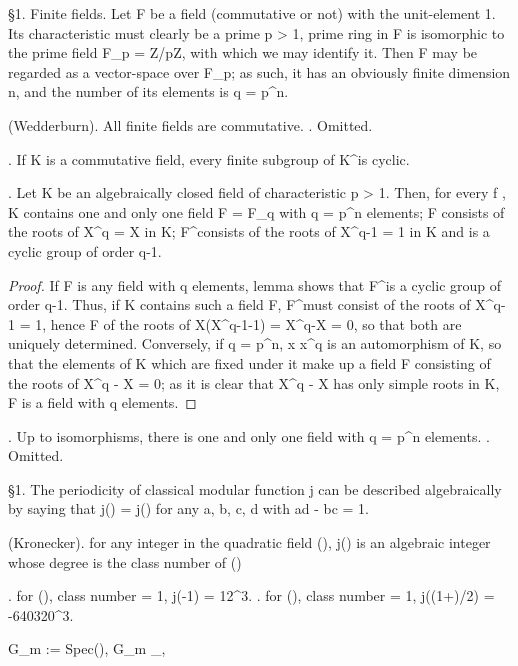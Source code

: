 

\S 1. Finite fields. Let F be a field (commutative or not) with the
unit-element 1. Its characteristic must clearly be a prime p > 1, 
prime ring in F is isomorphic to the prime field \mathbf F_p = \mathbf Z/p\mathbf Z, with 
which we may identify it. Then F may be regarded as a vector-space over \mathbf F_p;  
as such, it has an obviously finite dimension n, and the number of its 
elements is q = p^n. 

\theorem (Wedderburn). All finite fields are commutative. 
\proof. Omitted.

\lemma. If K is a commutative field, every finite subgroup of K^\times is cyclic.

\theorem. Let K be an algebraically closed field of characteristic p > 1. 
Then, for every f , K contains one and only one field F = F_q with 
q = p^n elements; F consists of the roots of X^q = X in K; F^\times consists 
of the roots of X^{q-1} = 1 in K and is a cyclic group of order q-1. 

\begin{proof}
  If F is any field with q elements, lemma shows that F^\times is a cyclic 
group of order q-1. Thus, if K contains such a field F, F^\times must consist 
of the roots of X^{q-1} = 1, hence F of the roots of X(X^{q-1}-1) = X^q-X = 0, 
so that both are uniquely determined. 
  Conversely, if q = p^n, x \mapsto x^q is an automorphism of K, 
so that the elements of K which are fixed under it make up a field F 
consisting of the roots of X^q - X = 0; as it is clear that X^q - X 
has only simple roots in K, F is a field with q elements. 
\end{proof}

\corollary. Up to isomorphisms, there is one and only one field with q = p^n elements. 
\proof. Omitted.








\S 1. The periodicity of classical modular function j can be 
described algebraically by saying that j(\tau) = j() 
for any a, b, c, d \in \Z with ad - bc = 1.

\theorem (Kronecker). for any integer \tau in the quadratic field \Q(), 
j(\tau) is an algebraic integer whose degree is the class number of \Q()

\example. for \Q(), class number = 1, j(-1) = 12^3.
\example. for \Q(), class number = 1, j((1+)/2) = -640320^3.






\mathbb G_m := Spec(\Z[U, U^-1]), 
\mathbb G_m \times_\Z \C, 



